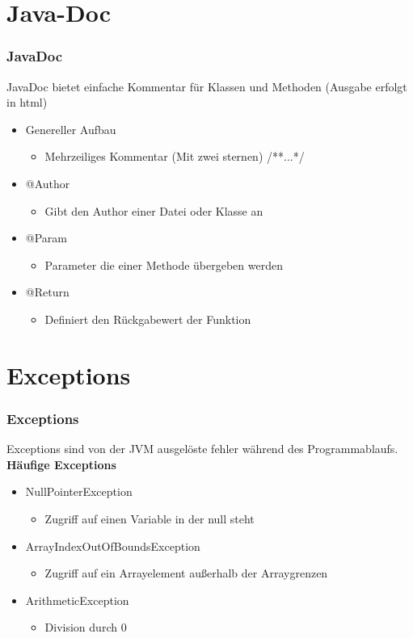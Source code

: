 \documentclass[final]{beamer}
\begin{document}
\section{Java-Doc}
\begin{frame}
	\frametitle{JavaDoc}
	JavaDoc bietet einfache Kommentar für Klassen und Methoden (Ausgabe erfolgt in html)
	\begin{itemize}
		\item{Genereller Aufbau}
			\begin{itemize}
				\item{Mehrzeiliges Kommentar (Mit zwei sternen) /**...*/}
			\end{itemize}
		\item{@Author}
			\begin{itemize}
				\item{Gibt den Author einer Datei oder Klasse an}
			\end{itemize}
		\item{@Param}
			\begin{itemize}
				\item{Parameter die einer Methode übergeben werden}
			\end{itemize}
		\item{@Return}
			\begin{itemize}
				\item{Definiert den Rückgabewert der Funktion}
			\end{itemize}
	\end{itemize}
\end{frame}

\section{Exceptions}
\begin{frame}
	\frametitle{Exceptions}
Exceptions sind von der JVM ausgelöste fehler während des Programmablaufs.\\
\vfill
	\textbf{Häufige Exceptions}
	\begin{itemize}
		\item{NullPointerException}
			\begin{itemize}
				\item{Zugriff auf einen Variable in der \color{blue}null \color{black} steht}
			\end{itemize}
		\item{ArrayIndexOutOfBoundsException}
			\begin{itemize}
				\item{Zugriff auf ein Arrayelement außerhalb der Arraygrenzen}
			\end{itemize}
		\item{ArithmeticException}
			\begin{itemize}
				\item{Division durch 0}
			\end{itemize}
	\end{itemize}
\end{frame}
\end{document}
